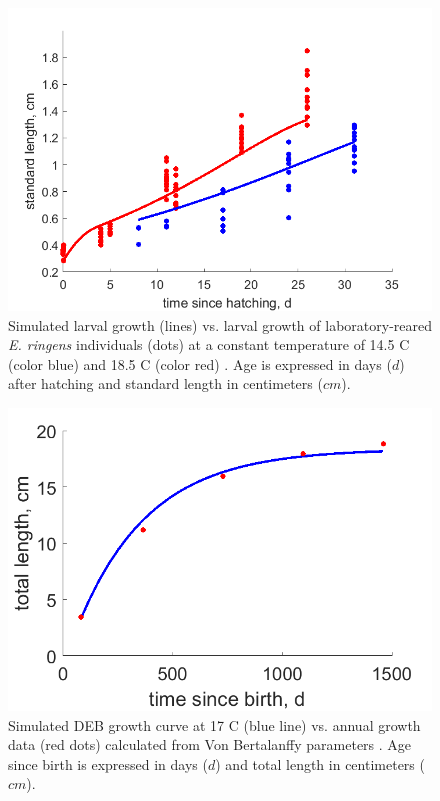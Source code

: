 \begin{figure}[ht]
	\includegraphics[width=1.0\textwidth]{figures/Chap4LarvaDataVSModel.png}
	\centering
	\caption{Simulated larval growth (lines) vs. larval growth of laboratory-reared \textit{E. ringens} individuals (dots) at a constant temperature of 14.5 \textdegree C (color blue) and 18.5 \textdegree C (color red) \citep{RiouOfel2021}. Age is expressed in days ($d$) after hatching and standard length in centimeters ($cm$).}
	\label{Chap4LarvaDataVSModel}
\end{figure}

\begin{figure}[ht]
	\includegraphics[width=1.0\textwidth]{figures/Chap4AdultDataVSModel.png}
	\centering
	\caption{Simulated DEB growth curve at 17 \textdegree C (blue line) vs. annual growth data (red dots) calculated from Von Bertalanffy parameters \citep{PaloMuck1987}. Age since birth is expressed in days ($d$) and total length in centimeters ($cm$).}
	\label{Chap4AdultDataVSModel}
\end{figure}

